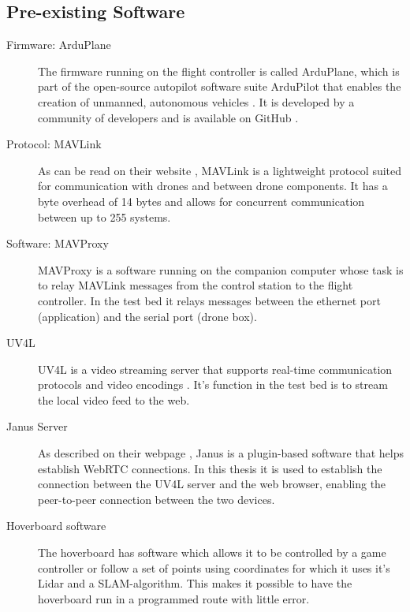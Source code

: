\documentclass[nofilelist]{cslthse-msc}
\begin{document}
\subsection{Pre-existing Software}
\begin{description}
   \item[Firmware: ArduPlane]
   The firmware running on the flight controller is called ArduPlane, which is part of the open-source autopilot software suite ArduPilot that enables the creation of unmanned, autonomous vehicles \cite{ardupilot-org}. It is developed by a community of developers and is available on GitHub \cite{ardupilot-github}.
   
   \item[Protocol: MAVLink]
   As can be read on their website \cite{mavlink}, MAVLink is a lightweight protocol suited for communication with drones and between drone components. It has a byte overhead of 14 bytes and allows for concurrent communication between up to 255 systems. 

   \item [Software: MAVProxy]
   MAVProxy \cite{mavproxy} is a software running on the companion computer whose task is to relay MAVLink messages from the control station to the flight controller. In the test bed it relays messages between the ethernet port (application) and the serial port (drone box). 

   \item[UV4L]
   UV4L is a video streaming server that supports real-time communication protocols and video encodings \cite{uv4l}. It's function in the test bed is to stream the local video feed to the web. 
   
   \item[Janus Server]
   As described on their webpage \cite{janus}, Janus is a plugin-based software that helps establish WebRTC connections. In this thesis it is used to establish the connection between the UV4L server and the web browser, enabling the peer-to-peer connection between the two devices.

   \item[Hoverboard software] The hoverboard has software which allows it to be controlled by a game controller or follow a set of points using coordinates for which it uses it's Lidar and a SLAM-algorithm. This makes it possible to have the hoverboard run in a programmed route with little error. 
\end{description}
\end{document}
